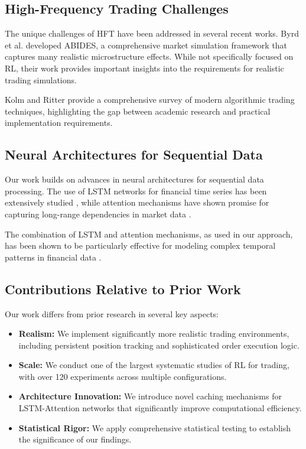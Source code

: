 \documentclass[conference]{IEEEtran}
\begin{document}
\subsection{High-Frequency Trading Challenges}

The unique challenges of HFT have been addressed in several recent works. Byrd et al. \cite{byrd2020abides} developed ABIDES, a comprehensive market simulation framework that captures many realistic microstructure effects. While not specifically focused on RL, their work provides important insights into the requirements for realistic trading simulations.

Kolm and Ritter \cite{kolm2020modern} provide a comprehensive survey of modern algorithmic trading techniques, highlighting the gap between academic research and practical implementation requirements.

\subsection{Neural Architectures for Sequential Data}

Our work builds on advances in neural architectures for sequential data processing. The use of LSTM networks for financial time series has been extensively studied \cite{nelson2017stock}, while attention mechanisms have shown promise for capturing long-range dependencies in market data \cite{li2019enhancing}.

The combination of LSTM and attention mechanisms, as used in our approach, has been shown to be particularly effective for modeling complex temporal patterns in financial data \cite{zhang2021dual}.

\subsection{Contributions Relative to Prior Work}

Our work differs from prior research in several key aspects:

\begin{itemize}
\item \textbf{Realism:} We implement significantly more realistic trading environments, including persistent position tracking and sophisticated order execution logic.

\item \textbf{Scale:} We conduct one of the largest systematic studies of RL for trading, with over 120 experiments across multiple configurations.

\item \textbf{Architecture Innovation:} We introduce novel caching mechanisms for LSTM-Attention networks that significantly improve computational efficiency.

\item \textbf{Statistical Rigor:} We apply comprehensive statistical testing to establish the significance of our findings.
\end{itemize}
\end{document}

